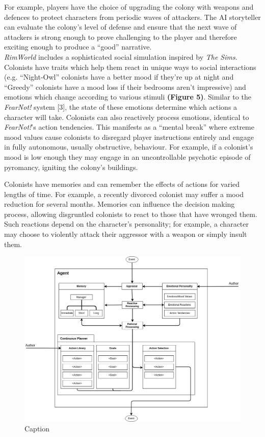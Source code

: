 \documentclass{sig-alternate-05-2015}
\begin{document}
For example, players have the choice of upgrading the colony with weapons and defences to protect characters from periodic waves of attackers. The AI storyteller can evaluate the colony's level of defense and ensure that the next wave of attackers is strong enough to prove challenging to the player and therefore exciting enough to produce a ``good'' narrative.\\

\newline \textit{RimWorld} includes a sophisticated social simulation inspired by \textit{The Sims}. Colonists have traits which help them react in unique ways to social interactions (e.g. ``Night-Owl'' colonists have a better mood if they're up at night and ``Greedy'' colonists have a mood loss if their bedrooms aren't impressive) and emotions which change according to various stimuli \textbf{(Figure 5)}. Similar to the \textit{FearNot!} system [3], the state of these emotions determine which actions a character will take. Colonists can also reactively process emotions, identical to \textit{FearNot!}'s action tendencies. This manifests as a ``mental break'' where extreme mood values cause colonists to disregard player instructions entirely and engage in fully autonomous, usually obstructive, behaviour. For example, if a colonist's mood is low enough they may engage in an uncontrollable psychotic episode of pyromancy, igniting the colony's buildings.

Colonists have memories and can remember the effects of actions for varied lengths of time. For example, a recently divorced colonist may suffer a mood reduction for several months. Memories can influence the decision making process, allowing disgruntled colonists to react to those that have wronged them. Such reactions depend on the character's personality; for example, a character may choose to violently attack their aggressor with a weapon or simply insult them.

\begin{figure}[!b]
\centering
\includegraphics[scale=0.4]{Images/AgentArchitecture.png}
\caption{Caption}
\end{figure}
\end{document}

